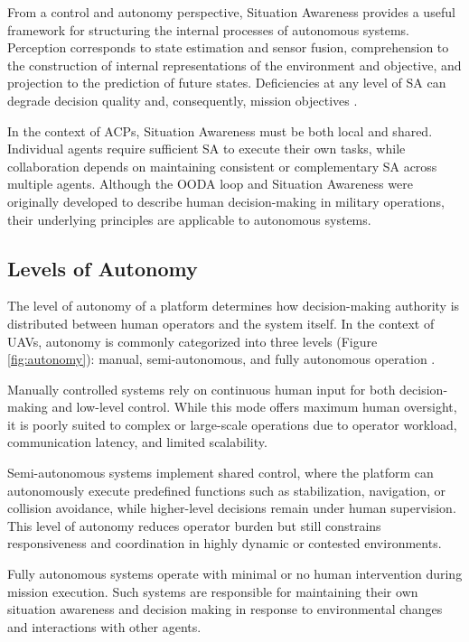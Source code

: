 From a control and autonomy perspective, Situation Awareness provides a useful framework for structuring the internal processes of autonomous systems. Perception corresponds to state estimation and sensor fusion, comprehension to the construction of internal representations of the environment and objective, and projection to the prediction of future states. Deficiencies at any level of SA can degrade decision quality and, consequently, mission objectives \cite{Endsley1995SituationAwareness}.

In the context of ACPs, Situation Awareness must be both local and shared. Individual agents require sufficient SA to execute their own tasks, while collaboration depends on maintaining consistent or complementary SA across multiple agents. Although the OODA loop and Situation Awareness were originally developed to describe human decision-making in military operations, their underlying principles are applicable to autonomous systems.

\subsection{Levels of Autonomy}

The level of autonomy of a platform determines how decision-making authority is distributed between human operators and the system itself. In the context of UAVs, autonomy is commonly categorized into three levels (Figure \ref{fig:autonomy}): manual, semi-autonomous, and fully autonomous operation  \cite{ekecki2025uavcontrolsurvey}.

Manually controlled systems rely on continuous human input for both decision-making and low-level control. While this mode offers maximum human oversight, it is poorly suited to complex or large-scale operations due to operator workload, communication latency, and limited scalability.

Semi-autonomous systems implement shared control, where the platform can autonomously execute predefined functions such as stabilization, navigation, or collision avoidance, while higher-level decisions remain under human supervision. This level of autonomy reduces operator burden but still constrains responsiveness and coordination in highly dynamic or contested environments.

Fully autonomous systems operate with minimal or no human intervention during mission execution. Such systems are responsible for maintaining their own situation awareness and decision making in response to environmental changes and interactions with other agents.


